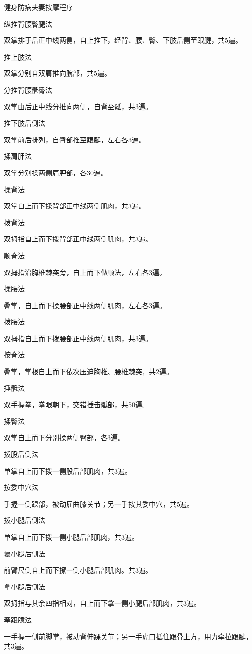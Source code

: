 \documentclass[12pt,UTF8,openany]{ctexbook}
\begin{document}
健身防病夫妻按摩程序


纵推背腰臀腿法

双掌排于后正中线两侧，自上推下，经背、腰、臀、下肢后侧至跟腱，共5遍。

推上肢法

双掌分别自双肩推向腕部，共5遍。

分推背腰骶臀法

双掌由后正中线分推向两侧，自背至骶，共3遍。

推下肢后侧法

双掌前后排列，自臀部推至跟腱，左右各3遍。

揉肩胛法

双掌分别揉两侧肩胛部，各30遍。

揉背法

双掌自上而下揉背部正中线两侧肌肉，共3遍。

拨背法

双拇指自上而下拨背部正中线两侧肌肉，共3遍。

顺脊法

双拇指沿胸椎棘突旁，自上而下做顺法，左右各3遍。

揉腰法

叠掌，自上而下揉腰部正中线两侧肌肉，左右各3遍。

拨腰法

双拇指自上而下拨腰部正中线两侧肌肉，共3遍。

按脊法

叠掌，掌根自上而下依次压迫胸椎、腰椎棘突，共2遍。

捶骶法

双手握拳，拳眼朝下，交错捶击骶部，共50遍。

揉臀法

双掌自上而下分别揉两侧臀部，各3遍。

拨股后侧法

单掌自上而下拨一侧股后部肌肉，共3遍。

按委中穴法

手握一侧踝部，被动屈曲膝关节；另一手按其委中穴，共5遍。

拨小腿后侧法

单掌自上而下拨一侧小腿后部肌肉，共3遍。

褒小腿后侧法

前臂尺侧自上而下撩一侧小腿后部肌肉。共3遍。

拿小腿后侧法

双拇指与其余四指相对，自上而下拿一侧小腿后部肌肉，共3遍。

牵跟臆法

一手握一侧前脚掌，被动背伸踝关节；另一手虎口抵住跟骨上方，用力牵拉跟腱，共3遍。
\end{document}
